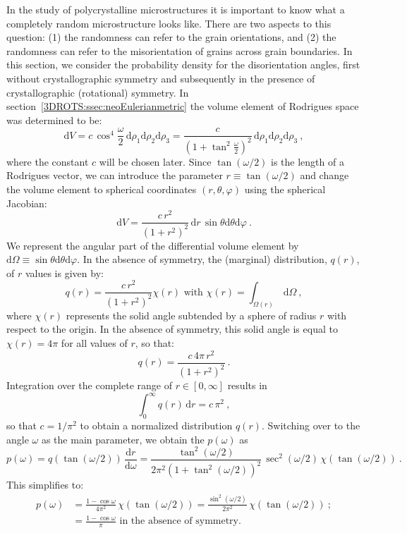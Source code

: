 In the study of polycrystalline microstructures it is important to know what a completely random microstructure looks like. There are two aspects to this question: (1) the randomness can refer to the grain orientations, and (2) the randomness can refer to the misorientation of grains across grain boundaries.  In this section, we consider the probability density for the disorientation angles, first without crystallographic symmetry and subsequently in the presence of crystallographic (rotational) symmetry.  In section~\ref{3DROTS:ssec:neoEulerianmetric} the volume element of Rodrigues space was determined to be:
\[
	\mathrm{d}V = c\,\cos^4\frac{\omega}{2}\,\mathrm{d}\rho_1\mathrm{d}\rho_2\mathrm{d}\rho_3 = \frac{c}{(1+\tan^2\frac{\omega}{2})^2}\,\mathrm{d}\rho_1\mathrm{d}\rho_2\mathrm{d}\rho_3\ ,
\]
where the constant $c$ will be chosen later.  Since $\tan(\omega/2)$ is the length of a Rodrigues vector, we can introduce the parameter $r\equiv\tan(\omega/2)$ and change the volume element to spherical coordinates $(r,\theta,\varphi)$ using the spherical Jacobian:
\[
	\mathrm{d}V = \frac{c\,r^2}{(1+r^2)^2}\,\mathrm{d}r\,\sin\theta\mathrm{d}\theta\mathrm{d}\varphi\ .
\]
We represent the angular part of the differential volume element by $\mathrm{d}\Omega\equiv \sin\theta\mathrm{d}\theta\mathrm{d}\varphi$.  In the absence of symmetry, the (marginal) distribution, $q(r)$, of $r$ values is given by:
\[
	q(r) = \frac{c\,r^2}{(1+r^2)^2}\chi(r)\text{ with }\chi(r) = \int_{\Omega(r)}\,\mathrm{d}\Omega\ ,
\]
where $\chi(r)$ represents the solid angle subtended by a sphere of radius $r$ with respect to the origin.  In the absence of symmetry, this solid angle is equal to $\chi(r)=4\pi$ for all values of $r$, so that:
\[
	q(r) = \frac{c\, 4\pi \,r^2}{(1+r^2)^2}\ .
\]
Integration over the complete range of $r\in[0,\infty]$ results in 
\[
	\int_0^{\infty}q(r)\,\mathrm{d}r = c\, \pi^2\ ,
\]
so that $c=1/\pi^2$ to obtain a normalized distribution $q(r)$.  Switching over to the angle $\omega$ as the main parameter, we obtain the  $p(\omega)$ as
\begin{equation}
	p(\omega) = q(\tan(\omega/2))\, \frac{\mathrm{d}r}{\mathrm{d}\omega} = \frac{\tan^2(\omega/2)}{2\pi^2(1+\tan^2(\omega/2))^2}\,\sec^2(\omega/2)\,\chi(\tan(\omega/2))\ .
\end{equation}
This simplifies to:
\begin{equation}
\begin{split}
	p(\omega) &= \frac{1-\cos\omega}{4\pi^2}\,\chi(\tan(\omega/2))=\frac{\sin^2(\omega/2)}{2\pi^2}\,\chi(\tan(\omega/2))\ ;\\
	&= \frac{1-\cos\omega}{\pi}\text{ in the absence of symmetry.}
\end{split}
\end{equation}

